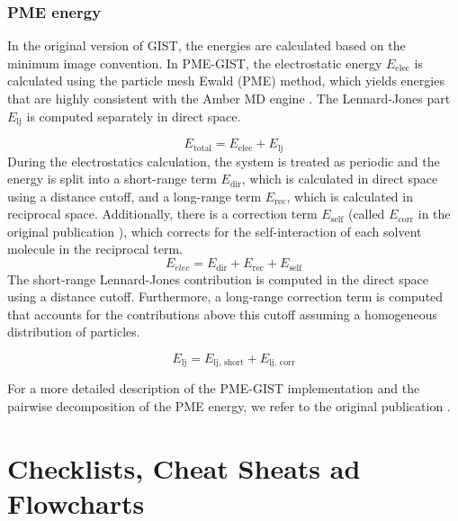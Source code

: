 \documentclass[9pt,tutorial]{livecoms}
\begin{document}
\subsubsection{PME energy}
In the original version of GIST, the energies are calculated based on the minimum image convention.
In PME-GIST, the electrostatic energy $E_\text{elec}$ is calculated using the particle mesh Ewald (PME) method, which yields energies that are highly consistent with the Amber MD engine \cite{Chen2021}.
The Lennard-Jones part $E_\text{lj}$ is computed separately in direct space.

\begin{equation}
	E_\text{total} = E_\text{elec} + E_\text{lj}
\end{equation}
During the electrostatics calculation, the system is treated as periodic and the energy is split into a short-range term $E_\text{dir}$, which is calculated in direct space using a distance cutoff, and a long-range term $E_\text{rec}$, which is calculated in reciprocal space.
Additionally, there is a correction term $E_\text{self}$ (called $E_\text{corr}$ in the original publication \cite{Chen2021}), which corrects for the self-interaction of each solvent molecule in the reciprocal term.
\begin{equation}
	E_\textit{elec} = E_\text{dir} + E_\text{rec} + E_\text{self}
\end{equation}
The short-range Lennard-Jones contribution is computed in the direct space using a distance cutoff.
Furthermore, a long-range correction term is computed that accounts for the contributions above this cutoff assuming a homogeneous distribution of particles.

\begin{equation}
	E_\text{lj} = E_\text{lj,\ short} +  E_\text{lj,\ corr}
\end{equation}

For a more detailed description of the PME-GIST implementation and the pairwise decomposition of the PME energy, we refer to the original publication \cite{Chen2021}.
\section{Checklists, Cheat Sheats ad Flowcharts} \label{sec:checklists}
\end{document}
